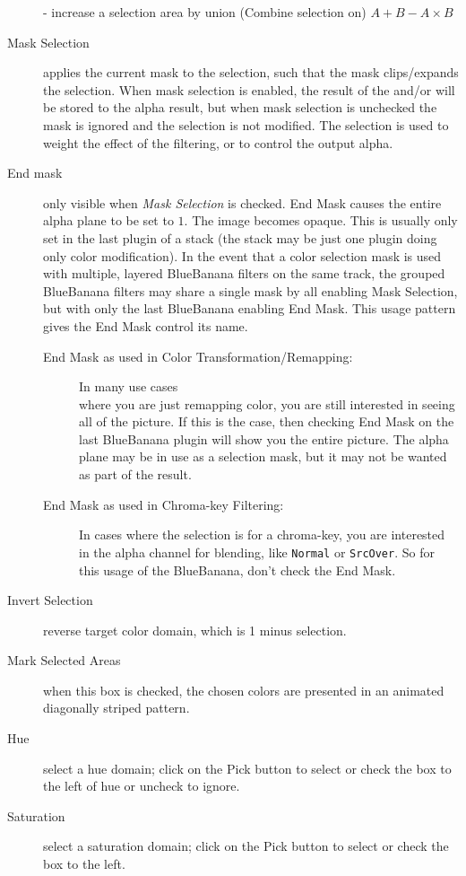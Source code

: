 \begin{description}
    - increase a selection area by union (Combine selection on) $A+B-A\times B$
    \item[Mask Selection] applies the current mask to the selection, such that the mask clips/expands the selection. When mask selection is enabled, the result of the and/or will be stored to the alpha result, but when mask selection is unchecked the mask is ignored and the selection is not modified. The selection is used to weight the effect of the filtering, or to control the output alpha.
    \item[End mask] only visible when \textit{Mask Selection} is checked. End Mask causes the entire alpha plane to
    be set to $1$. The image becomes opaque. This is usually only set in the last plugin of a stack (the stack may be just one plugin doing only color modification). In the event that a color selection mask is used with multiple, layered BlueBanana filters on the same track, the grouped BlueBanana filters may share a single mask by all enabling Mask Selection, but with only the last BlueBanana enabling End Mask. This usage pattern gives the End Mask control its name.
    \begin{description}
        \item[End Mask as used in Color Transformation/Remapping:] In many use cases \\
        where you are just remapping color, you are still interested in seeing all of the picture. If this is the case, then checking End Mask on the last BlueBanana plugin will show you the entire picture. The alpha plane may be in use as a selection mask, but it may not be wanted as part of the result.
        \item[End Mask as used in Chroma-key Filtering:] In cases where the selection is for a chroma-key, you are interested in the alpha channel for blending, like \texttt{Normal} or \texttt{SrcOver}. So for this usage of the BlueBanana, don't check the End Mask.
    \end{description}
    \item[Invert Selection] reverse target color domain, which is 1 minus selection.
    \item[Mark Selected Areas] when this box is checked, the chosen colors are presented in an animated 
    diagonally striped pattern.
    \item[Hue] select a hue domain; click on the Pick button to select or check the box to the left of hue or uncheck to ignore.
    \item[Saturation] select a saturation domain; click on the Pick button to select or check the box to the left.    

\end{description}
